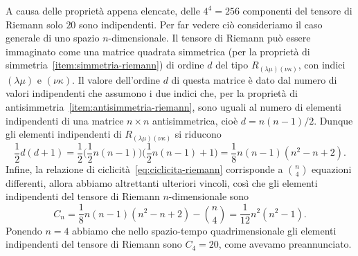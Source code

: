 A causa delle proprietà appena elencate, delle $4^{4} = 256$ componenti del
tensore di Riemann solo $20$ sono indipendenti.  Per far vedere ciò consideriamo
il caso generale di uno spazio $n$-dimensionale.  Il tensore di Riemann può
essere immaginato come una matrice quadrata simmetrica (per la proprietà di
simmetria~\ref{item:simmetria-riemann}) di ordine $d$ del tipo
$R_{(\lambda\mu)(\nu\kappa)}$, con indici $(\lambda\mu)$ e $(\nu\kappa)$.  Il
valore dell'ordine $d$ di questa matrice è dato dal numero di valori
indipendenti che assumono i due indici che, per la proprietà di
antisimmetria~\ref{item:antisimmetria-riemann}, sono uguali al numero di
elementi indipendenti di una matrice $n \times n$ antisimmetrica, cioè
$d = n(n-1)/2$.  Dunque gli elementi indipendenti di
$R_{(\lambda\mu)(\nu\kappa)}$ si riducono
\begin{equation}
  \frac{1}{2} d (d + 1) = \frac{1}{2}\bigg( \frac{1}{2}n(n-1) \bigg) \bigg(
  \frac{1}{2}n(n-1) +1 \bigg) = \frac{1}{8}n(n-1)(n^{2} - n +2).
\end{equation}
Infine, la relazione di ciclicità~\eqref{eq:ciclicita-riemann} corrisponde a
$\binom{n}{4}$ equazioni differenti, allora abbiamo altrettanti ulteriori
vincoli, così che gli elementi indipendenti del tensore di Riemann
$n$-dimensionale sono
\begin{equation}
  C_{n} = \frac{1}{8}n(n-1)(n^{2} - n +2) - \binom{n}{4} =
  \frac{1}{12}n^{2}(n^{2} - 1).
\end{equation}
Ponendo $n=4$ abbiamo che nello spazio-tempo quadrimensionale gli elementi
indipendenti del tensore di Riemann sono $C_{4} = 20$, come avevamo
preannunciato.

